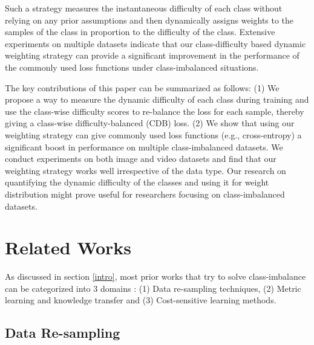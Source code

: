 \documentclass[runningheads]{llncs}
\begin{document}
Such a strategy measures the instantaneous difficulty of each class without 
relying
on any prior assumptions and then dynamically assigns weights to the samples of
the class in proportion to the difficulty of the class. Extensive experiments on 
multiple datasets indicate that our class-difficulty based dynamic weighting 
strategy can
provide a significant improvement in the performance of the commonly used loss
functions under class-imbalanced situations.

The key contributions of this paper can be summarized as follows: (1) We propose 
a way to measure the dynamic difficulty of each class during training and use
the class-wise difficulty scores to re-balance the loss for each sample, thereby 
giving a
class-wise difficulty-balanced (CDB) loss. (2) We show that using our weighting 
strategy can give commonly used loss functions (e.g., cross-entropy) a 
significant boost
in performance on multiple class-imbalanced datasets. We conduct experiments on
both image and video datasets and find that our weighting strategy works well 
irrespective of the data type. Our research on quantifying the dynamic 
difficulty of the
classes and using it for weight distribution might prove useful for researchers 
focusing on class-imbalanced datasets.














\section{Related Works}
\label{sec:relatedworks}

As discussed in section \ref{intro}, most prior works that try to solve 
class-imbalance can
be categorized into 3 domains : (1) Data re-sampling techniques, (2) Metric 
learning and knowledge transfer and (3) Cost-sensitive
learning methods.

\subsection{Data Re-sampling}
\end{document}
